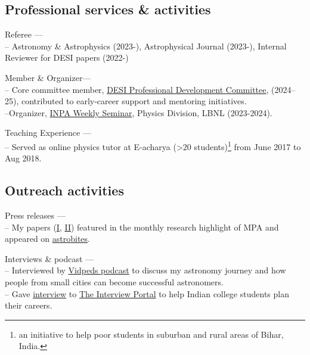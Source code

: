 \documentclass[12pt,letterpaper]{article}
\begin{document}
\vspace{-2mm}
\subsection{Professional services \& activities}

\begin{list}{}{\cvlist}
    \item Referee --- \\
    -- Astronomy \& Astrophysics (2023-), Astrophysical Journal (2023-), Internal Reviewer for DESI papers (2022-)
    \item Member \& Organizer--- \\
    	-- Core committee member, \href{https://desi.lbl.gov/trac/wiki/PublicPages/Contacts#ProfessionalDevelopmentCommittee}{DESI Professional Development Committee}, (2024–25), contributed to early-career support and mentoring initiatives.\\
        --Organizer, \href{https://inpa.lbl.gov/events/}{INPA Weekly Seminar}, Physics Division, LBNL (2023-2024). \\
      \item Teaching Experience --- \\
        -- Served as online physics tutor at E-acharya (>20 students)\footnote{an initiative to help poor students in suburban and rural areas of Bihar, India.} from June 2017 to Aug 2018. \\
        \end{list}
  \vspace{-2mm}
\subsection{Outreach activities}

\begin{list}{}{\cvlist}
    \item Press releases --- \\
        -- My papers (\href{https://www.mpa-garching.mpg.de/964620/hl202107}{I}, \href{https://www.mpa-garching.mpg.de/1066558/hl202211?c=27981}{II}) featured in the monthly research highlight of MPA and appeared on \href{https://astrobites.org/2021/05/06/cool-metal-gas-search-thanks-it-was-automated/}{astrobites}.
    \item Interviews \& podcast --- \\
      -- Interviewed by \href{https://www.youtube.com/watch?v=WmA_PnYLeCg}{Vidpeds podcast} to discuss my astronomy journey and how people from small cities can become successful astronomers. \\
      -- Gave \href{https://theinterviewportal.com/2020/03/13/astrophysicist-interview-8/}{interview} to \href{https://theinterviewportal.com/}{The Interview Portal} to help Indian college students plan their careers.
  \end{list}
\end{document}
